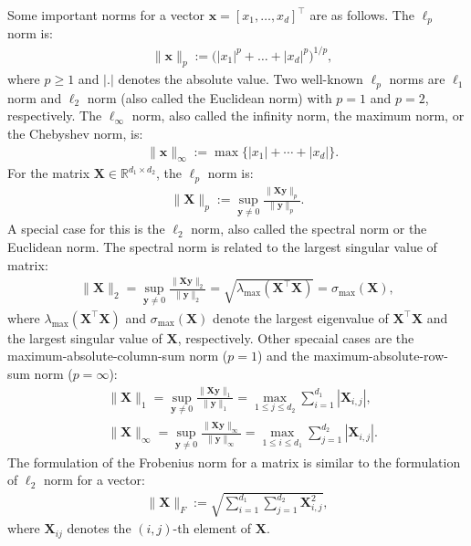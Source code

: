 \documentclass[lang=cn,10pt]{gorgeousnbook}
\numberwithin{equation}{section}%
\numberwithin{figure}{section}%
\begin{document}
\begin{definition}[重要的范数]
  Some important norms for a vector $\boldsymbol{x} = [x_1, \dots, x_d]^\top$ are as follows. 
  The $\ell_p$ norm is:
  \begin{align*}
  & \|\boldsymbol{x}\|_p := \big(|x_1|^p + \dots + |x_d|^p\big)^{1/p},
  \end{align*}
  where $p \geq 1$ and $|.|$ denotes the absolute value. 
  Two well-known $\ell_p$ norms are $\ell_1$ norm and $\ell_2$ norm (also called the Euclidean norm) with $p=1$ and $p=2$, respectively.
  The $\ell_\infty$ norm, also called the infinity norm, the maximum norm, or the Chebyshev norm, is:
  \begin{align*}
  & \|\boldsymbol{x}\|_\infty := \max\{|x_1| + \cdots + |x_d|\}. 
  \end{align*}
  For the matrix $\boldsymbol{X} \in \mathbb{R}^{d_1 \times d_2}$, the $\ell_p$ norm is:
  \begin{align*}
  \|\boldsymbol{X}\|_p := \sup_{\boldsymbol{y} \neq 0} \frac{\|\boldsymbol{X}\boldsymbol{y}\|_p}{\|\boldsymbol{y}\|_p}.
  \end{align*}
  A special case for this is the $\ell_2$ norm, also called the spectral norm or the Euclidean norm. The spectral norm is related to the largest singular value of matrix:
  \begin{align*}
  \|\boldsymbol{X}\|_2 = \sup_{\boldsymbol{y} \neq 0} \frac{\|\boldsymbol{X}\boldsymbol{y}\|_2}{\|\boldsymbol{y}\|_2} = \sqrt{\lambda_{\text{max}}(\boldsymbol{X}^\top \boldsymbol{X})} = \sigma_{\text{max}}(\boldsymbol{X}),
  \end{align*}
  where $\lambda_{\text{max}}(\boldsymbol{X}^\top \boldsymbol{X})$ and $\sigma_{\text{max}}(\boldsymbol{X})$ denote the largest eigenvalue of $\boldsymbol{X}^\top \boldsymbol{X}$ and the largest singular value of $\boldsymbol{X}$, respectively.
  Other specaial cases are the maximum-absolute-column-sum norm ($p=1$) and the maximum-absolute-row-sum norm ($p=\infty$):
  \begin{align*}
  & \|\boldsymbol{X}\|_1 = \sup_{\boldsymbol{y} \neq 0} \frac{\|\boldsymbol{X}\boldsymbol{y}\|_1}{\|\boldsymbol{y}\|_1} = \max_{1 \leq j \leq d_2} \sum_{i=1}^{d_1} |\boldsymbol{X}_{i,j}|, \\
  & \|\boldsymbol{X}\|_\infty = \sup_{\boldsymbol{y} \neq 0} \frac{\|\boldsymbol{X}\boldsymbol{y}\|_\infty}{\|\boldsymbol{y}\|_\infty} = \max_{1 \leq i \leq d_1} \sum_{j=1}^{d_2} |\boldsymbol{X}_{i,j}|.
  \end{align*}
The formulation of the Frobenius norm for a matrix is similar to the formulation of $\ell_2$ norm for a vector:
  \begin{align*}
  \|\boldsymbol{X}\|_F := \sqrt{\sum_{i=1}^{d_1} \sum_{j=1}^{d_2} \boldsymbol{X}_{i,j}^2},
  \end{align*}
where $\boldsymbol{X}_{ij}$ denotes the $(i,j)$-th element of $\boldsymbol{X}$.


\end{definition}
\end{document}
